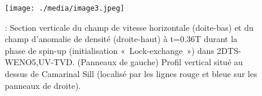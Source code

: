 \documentclass[12pt]{article}
\begin{document}

\begin{figure}[H]
	\begin{Center}
		\texttt{[image: ./media/image3.jpeg]}
		\caption{: Section verticale du champ de vitesse horizontale (doite-bas) et du champ d’anomalie de densité (droite-haut) à t=0.36T durant la phase de spin-up (initialisation « Lock-exchange ») dans 2DTS-WENO5,UV-TVD. (Panneaux de gauche) Profil vertical situé au dessus de Camarinal Sill (localisé par les lignes rouge et bleue sur les panneaux de droite).}
		\label{fig:_Section_verticale_du_champ_de_vitesse_horizontale_doitebas_et_du_champ_danomalie_de_densit_droitehaut__t036T_durant_la_phase_de_spinup_initialisation_Lockexchange_dans_2DTSWENO5UVTVD_Panneaux_de_gauche_Profil_vertical_situ_au_dessus_de_Camarinal_Sill_localis_par_les_lignes_rouge_et_bleue_sur_les_panneaux_de_droite}
	\end{Center}
\end{figure}



\par

\begin{adjustwidth}{0.0in}{0.39in}
\par

\end{adjustwidth}
\end{document}
